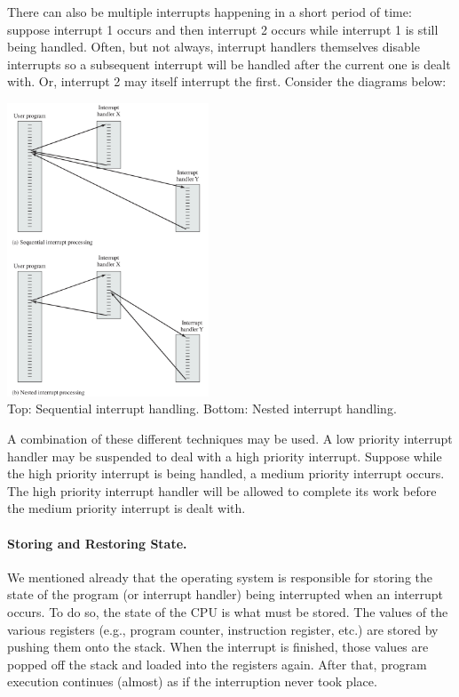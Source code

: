 There can also be multiple interrupts happening in a short period of time: suppose interrupt 1 occurs and then interrupt 2 occurs while interrupt 1 is still being handled. Often, but not always, interrupt handlers themselves disable interrupts so a subsequent interrupt will be handled after the current one is dealt with. Or, interrupt 2 may itself interrupt the first. Consider the diagrams below:

\begin{center}
\includegraphics[width=0.45\textwidth]{images/interrupts.png}\\
Top: Sequential interrupt handling. Bottom: Nested interrupt handling.~\cite{osi}
\end{center}

A combination of these different techniques may be used. A low priority interrupt handler may be suspended to deal with a high priority interrupt. Suppose while the high priority interrupt is being handled, a medium priority interrupt occurs. The high priority interrupt handler will be allowed to complete its work before the medium priority interrupt is dealt with.

\paragraph{Storing and Restoring State.} We mentioned already that the operating system is responsible for storing the state of the program (or interrupt handler) being interrupted when an interrupt occurs. To do so, the state of the CPU is what must be stored. The values of the various registers (e.g., program counter, instruction register, etc.) are stored by pushing them onto the stack. When the interrupt is finished, those values are popped off the stack and loaded into the registers again. After that, program execution continues (almost) as if the interruption never took place.

